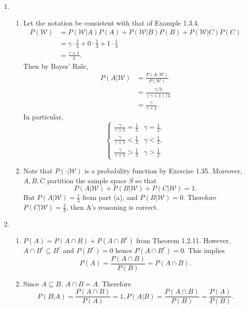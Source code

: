 \documentclass{article}
\begin{document}
\begin{enumerate}
    \item \begin{enumerate}
        \item Let the notation be consistent with that of Example 1.3.4. \begin{align*}
            P(\mathcal{W})
            &= P(\mathcal{W}|A)P(A) + P(\mathcal{W}|B)P(B) + P(\mathcal{W}|C)P(C) \\
            &= \gamma \cdot \frac{1}{3} + 0 \cdot \frac{1}{3} + 1 \cdot \frac{1}{3} \\
            &= \frac{\gamma + 1}{3}.
        \end{align*}
        Then by Bayes' Rule, 
        \begin{align*}
            P(A|\mathcal{W}) 
            &= \frac{P(A, \mathcal{W})}{P(\mathcal{W})} \\
            &= \frac{\gamma / 3}{(\gamma + 1) / 3} \\
            &= \frac{\gamma}{\gamma + 1}.
        \end{align*}
        In particular, 
        \[ \begin{cases}
            \frac{\gamma}{\gamma + 1} = \frac{1}{3} & \gamma = \frac{1}{2}, \\
            \frac{\gamma}{\gamma + 1} < \frac{1}{3} & \gamma < \frac{1}{2}, \\
            \frac{\gamma}{\gamma + 1} > \frac{1}{3} & \gamma > \frac{1}{2}.
        \end{cases} \]

        \item Note that $P(\cdot | \mathcal{W})$ is a probability function by Exercise 1.35. 
        Moreover, $A, B, C$ partition the sample space $S$ so that 
        \[ P(A|\mathcal{W}) + P(B|\mathcal{W}) + P(C|\mathcal{W}) = 1. \]
        But $P(A|\mathcal{W}) = \frac{1}{3}$ from part (a), and $P(B|\mathcal{W}) = 0$. 
        Therefore $P(C|\mathcal{W}) = \frac{2}{3}$, then A's reasoning is correct.
    \end{enumerate}

    \item \begin{enumerate}
        \item $P(A) = P(A \cap B) + P(A \cap B^c)$ from Theorem 1.2.11. However, 
        $A \cap B^{c} \subseteq B^{c}$ and $P(B^c) = 0$ hence $P(A \cap B^{c}) = 0$. 
        This implies 
        \[ P(A) = \frac{P(A \cap B)}{P(B)} = P(A \cap B). \]

        \item Since $A \subseteq B, \ A \cap B = A$. Therefore 
        \[ P(B|A) = \frac{P(A \cap B)}{P(A)} = 1, 
        P(A|B) = \frac{P(A \cap B)}{P(B)} = \frac{P(A)}{P(B)}. \]


\end{enumerate}
\end{enumerate}
\end{document}
